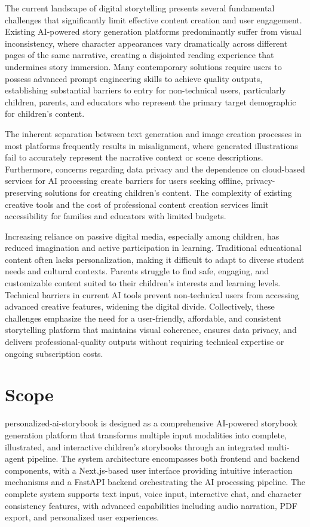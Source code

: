 The current landscape of digital storytelling presents several fundamental challenges that significantly limit effective content creation and user engagement. Existing AI-powered story generation platforms predominantly suffer from visual inconsistency, where character appearances vary dramatically across different pages of the same narrative, creating a disjointed reading experience that undermines story immersion. Many contemporary solutions require users to possess advanced prompt engineering skills to achieve quality outputs, establishing substantial barriers to entry for non-technical users, particularly children, parents, and educators who represent the primary target demographic for children's content.

The inherent separation between text generation and image creation processes in most platforms frequently results in misalignment, where generated illustrations fail to accurately represent the narrative context or scene descriptions. Furthermore, concerns regarding data privacy and the dependence on cloud-based services for AI processing create barriers for users seeking offline, privacy-preserving solutions for creating children's content. The complexity of existing creative tools and the cost of professional content creation services limit accessibility for families and educators with limited budgets.

Increasing reliance on passive digital media, especially among children, has reduced imagination and active participation in learning. Traditional educational content often lacks personalization, making it difficult to adapt to diverse student needs and cultural contexts. Parents struggle to find safe, engaging, and customizable content suited to their children's interests and learning levels. Technical barriers in current AI tools prevent non-technical users from accessing advanced creative features, widening the digital divide. Collectively, these challenges emphasize the need for a user-friendly, affordable, and consistent storytelling platform that maintains visual coherence, ensures data privacy, and delivers professional-quality outputs without requiring technical expertise or ongoing subscription costs.

\section{Scope}

personalized-ai-storybook is designed as a comprehensive AI-powered storybook generation platform that transforms multiple input modalities into complete, illustrated, and interactive children's storybooks through an integrated multi-agent pipeline. The system architecture encompasses both frontend and backend components, with a Next.js-based user interface providing intuitive interaction mechanisms and a FastAPI backend orchestrating the AI processing pipeline. The complete system supports text input, voice input, interactive chat, and character consistency features, with advanced capabilities including audio narration, PDF export, and personalized user experiences.

